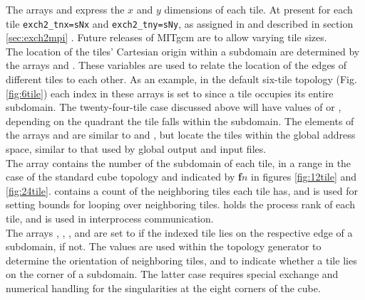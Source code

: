 The arrays  and
 express the $x$ and $y$ dimensions of
each tile.  At present for each tile \texttt{exch2\_tnx=sNx} and
\texttt{exch2\_tny=sNy}, as assigned in  and described in
section \ref{sec:exch2mpi} .  Future releases of MITgcm are to allow varying tile
sizes. \\

The location of the tiles' Cartesian origin within a subdomain are
determined by the arrays  and
.  These variables are used to
relate the location of the edges of different tiles to each other.  As
an example, in the default six-tile topology (Fig. \ref{fig:6tile})
each index in these arrays is set to  since a tile occupies
its entire subdomain.  The twenty-four-tile case discussed above will
have values of  or , depending on the quadrant the
tile falls within the subdomain.  The elements of the arrays
 and
 are similar to
 and
, but locate the tiles within the
global address space, similar to that used by global output and input
files. \\

The array  contains the number of
the subdomain of each tile, in a range  in the case of the
standard cube topology and indicated by \textbf{\textsf{f}}$n$ in
figures \ref{fig:12tile} and
\ref{fig:24tile}. 
contains a count of the neighboring tiles each tile has, and is used
for setting bounds for looping over neighboring tiles.
 holds the process rank of each
tile, and is used in interprocess communication.  \\


The arrays ,
,
, and
 are set to  if the
indexed tile lies on the respective edge of a subdomain,  if
not.  The values are used within the topology generator to determine
the orientation of neighboring tiles, and to indicate whether a tile
lies on the corner of a subdomain.  The latter case requires special
exchange and numerical handling for the singularities at the eight
corners of the cube. \\


